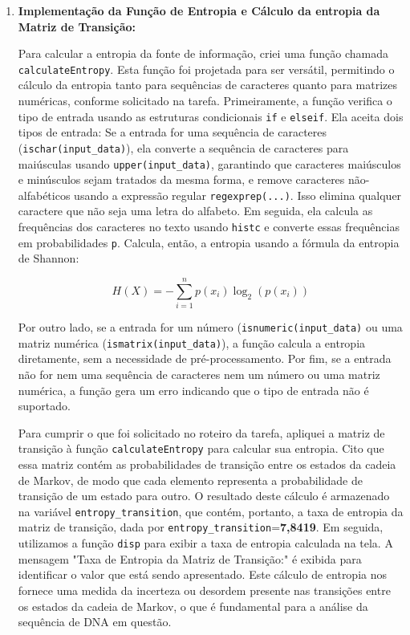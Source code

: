 \documentclass{article}
\begin{document}
\begin{enumerate}
    \item \textbf{{Implementação da Função de Entropia e Cálculo da entropia da Matriz de Transição:}} 
    
    Para calcular a entropia da fonte de informação, criei uma função chamada \texttt{calculateEntropy}. Esta função foi projetada para ser versátil, permitindo o cálculo da entropia tanto para sequências de caracteres quanto para matrizes numéricas, conforme solicitado na tarefa. 
    Primeiramente, a função verifica o tipo de entrada usando as estruturas condicionais \texttt{if} e \texttt{elseif}. Ela aceita dois tipos de entrada: Se a entrada for uma sequência de caracteres (\texttt{ischar(input\_data)}), ela converte a sequência de caracteres para maiúsculas usando \texttt{upper(input\_data)}, garantindo que caracteres maiúsculos e minúsculos sejam tratados da mesma forma, e remove caracteres não-alfabéticos usando a expressão regular \texttt{regexprep(...)}. Isso elimina qualquer caractere que não seja uma letra do alfabeto. Em seguida, ela calcula as frequências dos caracteres no texto usando \texttt{histc} e converte essas frequências em probabilidades \texttt{p}. Calcula, então, a entropia usando a fórmula da entropia de Shannon: 
    
    \begin{equation}
    H(X) = -\sum_{i=1}^{n} p(x_i) \log_2(p(x_i))
    \end{equation}
    
    Por outro lado, se a entrada for um número (\texttt{isnumeric(input\_data)} ou uma matriz numérica (\texttt{ismatrix(input\_data)}), a função calcula a entropia diretamente, sem a necessidade de pré-processamento. Por fim, se a entrada não for nem uma sequência de caracteres nem um número ou uma matriz numérica, a função gera um erro indicando que o tipo de entrada não é suportado. 
    
    Para cumprir o que foi solicitado no roteiro da tarefa, apliquei a matriz de transição à função \texttt{calculateEntropy} para calcular sua entropia. Cito que essa matriz contém as probabilidades de transição entre os estados da cadeia de Markov, de modo que cada elemento representa a probabilidade de transição de um estado para outro.
    O resultado deste cálculo é armazenado na variável \texttt{entropy\_transition}, que contém, portanto, a taxa de entropia da matriz de transição, dada por \texttt{entropy\_transition}=\textbf{7,8419}.
    Em seguida, utilizamos a função \texttt{disp} para exibir a taxa de entropia calculada na tela. A mensagem "Taxa de Entropia da Matriz de Transição:" é exibida para identificar o valor que está sendo apresentado.
    Este cálculo de entropia nos fornece uma medida da incerteza ou desordem presente nas transições entre os estados da cadeia de Markov, o que é fundamental para a análise da sequência de DNA em questão.


\end{enumerate}
\end{document}
